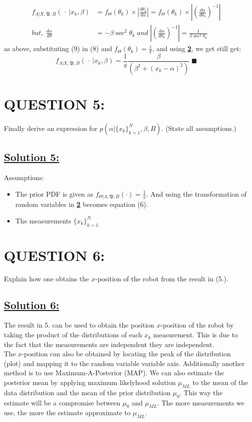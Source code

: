 \documentclass[a4paper,11pt]{article}
\begin{document}
\begin{align}
	f_{\Lambda | X, \mathfrak{B},B} (\, \cdot \, | x_k, \beta) &= f_\Theta (\theta_k) \times \left| \frac{d\theta_k}{d\alpha} \right| = f_\Theta (\theta_k) \times \left| \left(\frac{d\alpha}{d\theta_k} \right)^{-1} \right| \\
	but, \; \frac{d\alpha}{d\theta} &= -\beta \sec^2 \theta_k \; and \; \left| \left(\frac{d\alpha}{d\theta_k} \right)^{-1} \right| = \frac{1}{\beta \sec^2 \theta_k}
\end{align}
as above, substituting (9) in (8) and $f_\Theta (\theta_k) = \frac{1}{\pi}$, and using \hyperref[sec:proof]{\textbf{2}}, we get still get:
\begin{equation}
	f_{\Lambda | X, \mathfrak{B},B} (\, \cdot \, | x_k, \beta) = \frac{1}{\pi} \frac{\beta}{(\beta^2 + (x_k - \alpha)^2)} \; \blacksquare
\end{equation}

\section{QUESTION 5:}
Finally derive an expression for $p(\alpha | \{x_k\}^N _{k = 1}, \beta, B)$. (State all assumptions.)

\subsection*{\underline{Solution 5:}}
Assumptions:
\begin{itemize}
	\item The prior PDF is given as $f_{\Theta|\Lambda, \mathfrak{B},B}(\cdot) = \frac{1}{\pi}$. And using the transformation of random variables in \hyperref[sec:proof]{\textbf{2}}  becomes equation (6).
	\item The measurements $\{x_k\}^N _{k = 1}$ 
\end{itemize}

\section{QUESTION 6:}
Explain how one obtains the $x$-position of the robot from the result in (5.).

\subsection*{\underline{Solution 6:}}
The result in 5. can be used to obtain the position $x$-position of the robot by taking the product of the distributions of each $x_k$ measurement. This is due to the fact that the measurements are independent they are independent.\\
The $x$-position can also be obtained by locating the peak of the distribution (plot) and mapping it to the random variable variable axis. Additionally another method is to use Maximum-A-Posterior (MAP). We can also estimate the posterior mean by applying maximum likelyhood solution $\mu_{ML}$ to the mean of the data distribution and the mean of the prior distribution $\mu_0$. This way the estimate will be a compromise between $\mu_0$ and $\mu_{ML}$. The more measurements we use, the more the estimate approximate to $\mu_{ML}$.
\end{document}
